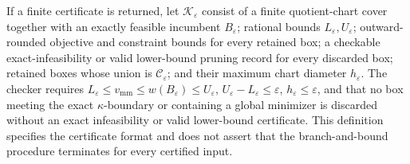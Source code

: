 If a finite certificate is returned, let \(\mathscr K_{\varepsilon}\) consist of a finite quotient-chart cover together with an exactly feasible incumbent \(B_{\varepsilon}\); rational bounds \(L_{\varepsilon},U_{\varepsilon}\); outward-rounded objective and constraint bounds for every retained box; a checkable exact-infeasibility or valid lower-bound pruning record for every discarded box; retained boxes whose union is \(\mathcal C_\varepsilon\); and their maximum chart diameter \(h_{\varepsilon}\). The checker requires \(L_{\varepsilon}\le v_{\mathrm{mm}}\le w(B_{\varepsilon})\le U_{\varepsilon}\), \(U_{\varepsilon}-L_{\varepsilon}\le\varepsilon\), \(h_{\varepsilon}\le\varepsilon\), and that no box meeting the exact \(\kappa\)-boundary or containing a global minimizer is discarded without an exact infeasibility or valid lower-bound certificate. This definition specifies the certificate format and does not assert that the branch-and-bound procedure terminates for every certified input.
